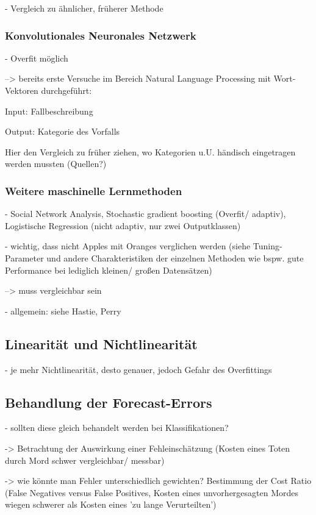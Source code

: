 \documentclass[a4paper,12pt,parskip,bibtotoc,liststotoc]{article}
\begin{document}
- Vergleich zu ähnlicher, früherer Methode

\subsubsection{Konvolutionales Neuronales Netzwerk }  

- Overfit möglich

--> bereits erste Versuche im Bereich Natural Language Processing mit Wort-Vektoren durchgeführt:

Input: 		Fallbeschreibung

Output: 	Kategorie des Vorfalls

Hier den Vergleich zu früher ziehen, wo Kategorien u.U. händisch eingetragen werden mussten (Quellen?)\\


\subsubsection{Weitere maschinelle Lernmethoden}

- Social Network Analysis, Stochastic gradient boosting (Overfit/ adaptiv), Logistische Regression (nicht adaptiv, nur zwei Outputklassen) 

- wichtig, dass nicht Apples mit Oranges verglichen werden (siehe Tuning-Parameter und andere Charakteristiken der einzelnen Methoden wie bspw. gute Performance bei lediglich kleinen/ großen Datensätzen)

--> muss vergleichbar sein

- allgemein: siehe Hastie, Perry


\subsection{Linearität und Nichtlinearität}

- je mehr Nichtlinearität, desto genauer, jedoch Gefahr des Overfittings

\subsection{Behandlung der Forecast-Errors}

- sollten diese gleich behandelt werden bei Klassifikationen?

-> Betrachtung der Auswirkung einer Fehleinschätzung (Kosten eines Toten durch Mord schwer vergleichbar/ messbar)

-> wie könnte man Fehler unterschiedlich gewichten? Bestimmung der Cost Ratio (False Negatives versus False Positives, Kosten eines unvorhergesagten Mordes wiegen schwerer als Kosten eines 'zu lange Verurteilten')
\end{document}
